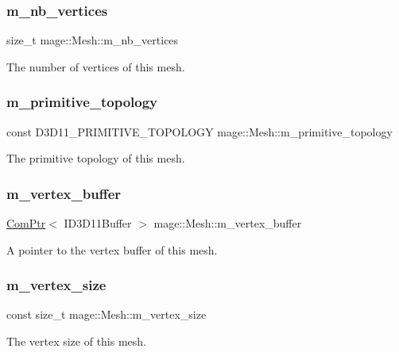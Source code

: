 \subsubsection{\texorpdfstring{m\+\_\+nb\+\_\+vertices}{m\_nb\_vertices}}
{\footnotesize\ttfamily size\+\_\+t mage\+::\+Mesh\+::m\+\_\+nb\+\_\+vertices\hspace{0.3cm}{\ttfamily [private]}}

The number of vertices of this mesh. \hypertarget{classmage_1_1_mesh_a329fab0ad24e11b73a8981c6d09a0c7c}{}\label{classmage_1_1_mesh_a329fab0ad24e11b73a8981c6d09a0c7c} 
\subsubsection{\texorpdfstring{m\+\_\+primitive\+\_\+topology}{m\_primitive\_topology}}
{\footnotesize\ttfamily const D3\+D11\+\_\+\+P\+R\+I\+M\+I\+T\+I\+V\+E\+\_\+\+T\+O\+P\+O\+L\+O\+GY mage\+::\+Mesh\+::m\+\_\+primitive\+\_\+topology\hspace{0.3cm}{\ttfamily [private]}}

The primitive topology of this mesh. \hypertarget{classmage_1_1_mesh_af5ae74887eb330201829477cf772ba6e}{}\label{classmage_1_1_mesh_af5ae74887eb330201829477cf772ba6e} 
\subsubsection{\texorpdfstring{m\+\_\+vertex\+\_\+buffer}{m\_vertex\_buffer}}
{\footnotesize\ttfamily \hyperlink{namespacemage_ae74f374780900893caa5555d1031fd79}{Com\+Ptr}$<$ I\+D3\+D11\+Buffer $>$ mage\+::\+Mesh\+::m\+\_\+vertex\+\_\+buffer\hspace{0.3cm}{\ttfamily [protected]}}

A pointer to the vertex buffer of this mesh. \hypertarget{classmage_1_1_mesh_ab3ebdfffca054f32ac69e47c486d57b1}{}\label{classmage_1_1_mesh_ab3ebdfffca054f32ac69e47c486d57b1} 
\subsubsection{\texorpdfstring{m\+\_\+vertex\+\_\+size}{m\_vertex\_size}}
{\footnotesize\ttfamily const size\+\_\+t mage\+::\+Mesh\+::m\+\_\+vertex\+\_\+size\hspace{0.3cm}{\ttfamily [private]}}

The vertex size of this mesh. 